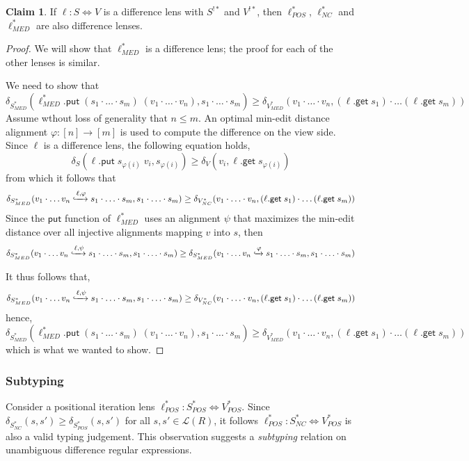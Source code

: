 \documentclass[acmsmall,review,anonymous]{acmart}\settopmatter{printfolios=true,printccs=false,printacmref=false}
\theoremstyle{definition}
\newtheorem{claim}{Claim}
\newcommand{\kw}[1]{\ensuremath{\mathsf{#1}}\xspace}
\newcommand{\get}{\ensuremath{\kw{get}}\xspace}
\newcommand{\pput}{\ensuremath{\kw{put}}\xspace}
\begin{document}
\begin{claim}
If $\ell : S \Leftrightarrow V$ is a difference lens with $S^{!*}$ and $V^{!*}$, then $\ell^*_{POS}$, $\ell^*_{NC}$ and $\ell^*_{MED}$ are also difference lenses.
\end{claim}
\begin{proof}
We will show that $\ell^*_{MED}$ is a difference lens; the proof for each of the other lenses is similar.

We need to show that
$$\delta_{S^*_{MED}}(\ell^*_{MED}.\pput \; (s_1 \cdot \ldots \cdot s_m) \; (v_1 \cdot \ldots \cdot v_n), s_1 \cdot \ldots \cdot s_m) \geq \delta_{V^*_{MED}}(v_1 \cdot \ldots \cdot v_n, (\ell.\get \; s_1) \cdot \ldots (\ell.\get \; s_m))$$
Assume wthout loss of generality that $n \leq m$. An optimal min-edit distance alignment $\varphi : [n] \longrightarrow [m]$ is used to compute the difference on the view side. Since $\ell$ is a difference lens, the following equation holds,
$$\delta_S(\ell.\pput \; s_{\varphi(i)} \; v_i, s_{\varphi(i)}) \geq \delta_V(v_i, \ell.\get \; s_{\varphi(i)})$$
from which it follows that
$$\delta_{S^*_{MED}}(v_1 \cdot \ldots v_n \xhookrightarrow{\ell, \varphi} s_1 \cdot \ldots \cdot s_m, s_1 \cdot \ldots \cdot s_m) \geq \delta_{V^*_{NC}}(v_1 \cdot \ldots \cdot v_n, (\ell.\get \; s_1) \cdot \ldots (\ell.\get \; s_m))$$
Since the \pput function of $\ell^*_{MED}$ uses an alignment $\psi$ that maximizes the min-edit distance over all injective alignments mapping $v$ into $s$, then
$$\delta_{S^*_{MED}}(v_1 \cdot \ldots v_n \xhookrightarrow{\ell, \psi} s_1 \cdot \ldots \cdot s_m, s_1 \cdot \ldots \cdot s_m) \geq \delta_{S^*_{MED}}(v_1 \cdot \ldots v_n \xhookrightarrow{\varphi} s_1 \cdot \ldots \cdot s_m, s_1 \cdot \ldots \cdot s_m)$$

It thus follows that,
$$\delta_{S^*_{MED}}(v_1 \cdot \ldots v_n \xhookrightarrow{\ell, \psi} s_1 \cdot \ldots \cdot s_m, s_1 \cdot \ldots \cdot s_m) \geq \delta_{V^*_{NC}}(v_1 \cdot \ldots \cdot v_n, (\ell.\get \; s_1) \cdot \ldots (\ell.\get \; s_m))$$
hence,
$$\delta_{S^*_{MED}}(\ell^*_{MED}.\pput \; (s_1 \cdot \ldots \cdot s_m) \; (v_1 \cdot \ldots \cdot v_n), s_1 \cdot \ldots \cdot s_m) \geq \delta_{V^*_{MED}}(v_1 \cdot \ldots \cdot v_n, (\ell.\get \; s_1) \cdot \ldots (\ell.\get \; s_m))$$
which is what we wanted to show.
\end{proof}
\subsubsection{Subtyping}
Consider a positional iteration lens $\ell^*_{POS} : S^*_{POS} \Leftrightarrow V^*_{POS}$. Since $\delta_{S^*_{NC}}(s, s') \geq \delta_{S^*_{POS}}(s, s')$ for all $s, s' \in \mathcal{L}(R)$, it follows $\ell^*_{POS} : S^*_{NC} \Leftrightarrow V^*_{POS}$ is also a valid typing judgement. This observation suggests a {\em subtyping} relation on unambiguous difference regular expressions.
\end{document}
